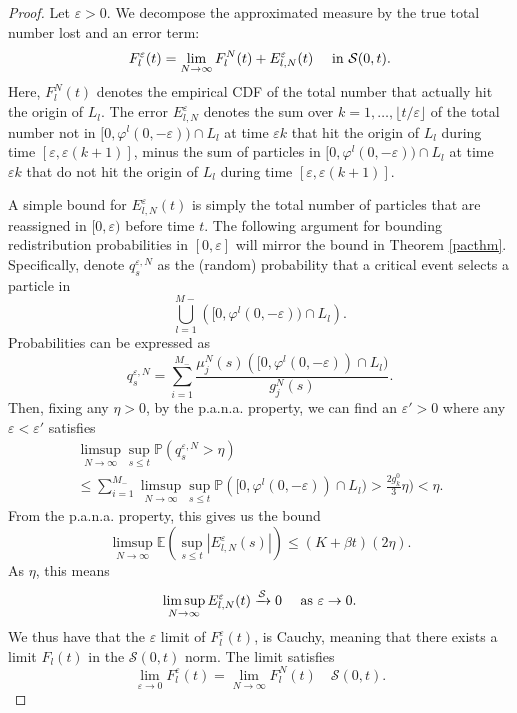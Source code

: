 \begin{proof}
Let $\varepsilon>0$. We decompose the approximated measure by the true total number lost and an error term:
\begin{equation}
F_l^\varepsilon(t)= \lim_{N\rightarrow \infty} F_l^N(t)+E_{l,N}^\varepsilon(t)     \quad \hbox{ in } \mathcal S(0,t) . 
\end{equation}
Here, $F_l^{N}(t)$ denotes the empirical CDF of the total number that actually hit the origin of $L_l$. The error $E_{l,N}^\varepsilon$ denotes the sum over $k = 1, \dots, \lfloor t/\varepsilon \rfloor$ of the total number not in $[0,\varphi^{l}(0,-\varepsilon)) \cap L_l$ at time $\varepsilon k$ that hit the origin of $L_l$ during time  $[\varepsilon ,\varepsilon (k+1)]$, minus the sum of particles in $[0,\varphi^l(0,-\varepsilon)) \cap L_l$ at time $\varepsilon k$  that do not hit the origin of $L_l$ during time  $[\varepsilon ,\varepsilon (k+1)]$.  

A simple bound for $E_{l,N}^\varepsilon(t)$ is simply the total number of particles that are reassigned in $[0,\varepsilon)$ before time $t$. The following argument for bounding  redistribution probabilities in $[0,\varepsilon]$ will mirror the bound in Theorem \ref{pacthm}.  Specifically, denote $q^{\varepsilon,N}_s$ as the (random) probability that a critical event selects a particle in 
\begin{equation}
\bigcup_{l = 1}^{M-}\left([0,\varphi^l(0,-\varepsilon))\cap L_l\right).
\end{equation}
Probabilities can be expressed as
\begin{equation}
q_s^{\varepsilon,N} = \sum_{i = 1}^{M_-}\frac{\mu_j^N(s)( [0,\varphi^l(0,-\varepsilon))\cap L_l)}{g_j^N(s)}.
\end{equation}
Then, fixing any $\eta >0$, by the p.a.n.a. property, we can find an $\varepsilon'>0$ where any $\varepsilon<\varepsilon'$ satisfies
\begin{eqnarray}
\limsup_{N\rightarrow \infty} \sup_{s\le t} \mathbb P(q^{\varepsilon,N}_s>\eta)\\
\le \sum_{i = 1}^{M_-}\limsup_{N\rightarrow \infty} \sup_{s\le t}\mathbb P([0,\varphi^l(0,-\varepsilon))\cap L_l)> \frac{2g^0_k}{3}\eta)<\eta.\nonumber
\end{eqnarray}
From the p.a.n.a. property, this gives us the bound
\begin{equation}
\limsup_{N\rightarrow \infty}\mathbb E(\sup_{s\le t}|E_{l,N}^\varepsilon(s)|)\le (K+\beta t) (2\eta).
\end{equation}     
As $\eta$,  this means
\begin{equation}
\limsup_{N \rightarrow \infty}E_{l,N}^\varepsilon(t) \xrightarrow{\mathcal S} 0 \quad \hbox{ as } \varepsilon  \rightarrow 0.  
\end{equation}
We thus have that the $\varepsilon$ limit of $F^\varepsilon_l(t)$, is Cauchy, meaning that there exists a limit $F_l(t)$ in the $\mathcal S(0,t)$ norm. The  limit satisfies 
\begin{equation}
\lim_{\varepsilon \rightarrow 0}F_l^\varepsilon(t)= \lim_{N\rightarrow \infty} F_l^N(t)     \quad \mathcal S(0,t). 
\end{equation} 
\end{proof}
